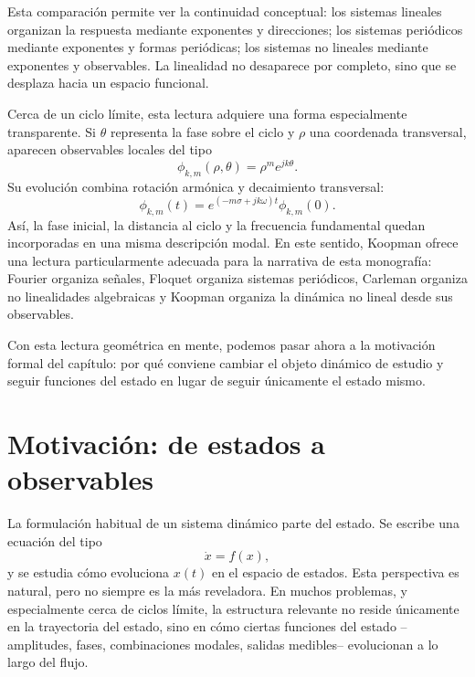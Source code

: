 Esta comparación permite ver la continuidad conceptual: los sistemas lineales organizan la respuesta mediante exponentes y direcciones; los sistemas periódicos mediante exponentes y formas periódicas; los sistemas no lineales mediante exponentes y observables. La linealidad no desaparece por completo, sino que se desplaza hacia un espacio funcional.


Cerca de un ciclo límite, esta lectura adquiere una forma especialmente transparente. Si \(\theta\) representa la fase sobre el ciclo y \(\rho\) una coordenada transversal, aparecen observables locales del tipo
\begin{equation}
\phi_{k,m}(\rho,\theta)=\rho^m e^{jk\theta}.
\label{eq:Koopman_intro_limit_cycle_observable}
\end{equation}
Su evolución combina rotación armónica y decaimiento transversal:
\begin{equation}
\phi_{k,m}(t)=
e^{(-m\sigma+jk\omega)t}\phi_{k,m}(0).
\label{eq:Koopman_intro_limit_cycle_evolution}
\end{equation}
Así, la fase inicial, la distancia al ciclo y la frecuencia fundamental quedan incorporadas en una misma descripción modal. En este sentido, Koopman ofrece una lectura particularmente adecuada para la narrativa de esta monografía: Fourier organiza señales, Floquet organiza sistemas periódicos, Carleman organiza no linealidades algebraicas y Koopman organiza la dinámica no lineal desde sus observables.

Con esta lectura geométrica en mente, podemos pasar ahora a la motivación formal del capítulo: por qué conviene cambiar el objeto dinámico de estudio y seguir funciones del estado en lugar de seguir únicamente el estado mismo.

\section{Motivación: de estados a observables}

La formulación habitual de un sistema dinámico parte del estado. Se escribe una ecuación del tipo
\begin{equation}
\dot{x}=f(x),
\label{eq:Koopman_motivation_state_dynamics}
\end{equation}
y se estudia cómo evoluciona \(x(t)\) en el espacio de estados. Esta perspectiva es natural, pero no siempre es la más reveladora. En muchos problemas, y especialmente cerca de ciclos límite, la estructura relevante no reside únicamente en la trayectoria del estado, sino en cómo ciertas funciones del estado --amplitudes, fases, combinaciones modales, salidas medibles-- evolucionan a lo largo del flujo.

